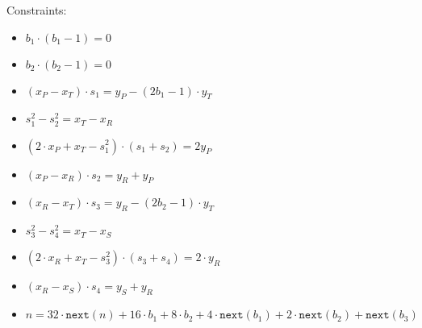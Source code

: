 Constraints:
\begin{itemize}
	\item $b_1 \cdot (b_1 - 1) = 0$
	\item $b_2 \cdot (b_2 - 1) = 0$
	\item $(x_P - x_T) \cdot s_1 = y_P - (2b_1 - 1) \cdot y_T$
	\item $s_1^2 - s_2^2 = x_T - x_R$
	\item $(2 \cdot x_P + x_T - s_1^2) \cdot (s_1 + s_2) = 2y_P$
	\item $(x_P - x_R) \cdot s_2 = y_R + y_P$
	\item $(x_R - x_T) \cdot s_3 = y_R - (2b_2 - 1) \cdot y_T$
	\item $s_3^2 - s_4^2 = x_T - x_S$
	\item $(2 \cdot x_R + x_T - s_3^2) \cdot (s_3 + s_4) = 2 \cdot y_R$
	\item $(x_R - x_S) \cdot s_4 = y_S + y_R$
	\item $n = 32 \cdot \texttt{next}(n) + 16 \cdot b_1 + 8 \cdot b_2 + 4 \cdot \texttt{next}(b_1) + 2 \cdot \texttt{next}(b_2) + \texttt{next}(b_3)$
\end{itemize}

